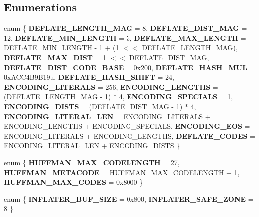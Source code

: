 \subsection*{Enumerations}
\begin{DoxyCompactItemize}
\item 
\mbox{\label{namespaceeka2l1_1_1flate_a0f9d064c5a1df98b8648bf2179261c23}} 
enum \{ \newline
{\bfseries D\+E\+F\+L\+A\+T\+E\+\_\+\+L\+E\+N\+G\+T\+H\+\_\+\+M\+AG} = 8, 
{\bfseries D\+E\+F\+L\+A\+T\+E\+\_\+\+D\+I\+S\+T\+\_\+\+M\+AG} = 12, 
{\bfseries D\+E\+F\+L\+A\+T\+E\+\_\+\+M\+I\+N\+\_\+\+L\+E\+N\+G\+TH} = 3, 
{\bfseries D\+E\+F\+L\+A\+T\+E\+\_\+\+M\+A\+X\+\_\+\+L\+E\+N\+G\+TH} = D\+E\+F\+L\+A\+T\+E\+\_\+\+M\+I\+N\+\_\+\+L\+E\+N\+G\+TH -\/ 1 + (1 $<$$<$ D\+E\+F\+L\+A\+T\+E\+\_\+\+L\+E\+N\+G\+T\+H\+\_\+\+M\+AG), 
\newline
{\bfseries D\+E\+F\+L\+A\+T\+E\+\_\+\+M\+A\+X\+\_\+\+D\+I\+ST} = 1 $<$$<$ D\+E\+F\+L\+A\+T\+E\+\_\+\+D\+I\+S\+T\+\_\+\+M\+AG, 
{\bfseries D\+E\+F\+L\+A\+T\+E\+\_\+\+D\+I\+S\+T\+\_\+\+C\+O\+D\+E\+\_\+\+B\+A\+SE} = 0x200, 
{\bfseries D\+E\+F\+L\+A\+T\+E\+\_\+\+H\+A\+S\+H\+\_\+\+M\+UL} = 0x\+A\+C\+C4\+B9\+B19u, 
{\bfseries D\+E\+F\+L\+A\+T\+E\+\_\+\+H\+A\+S\+H\+\_\+\+S\+H\+I\+FT} = 24, 
\newline
{\bfseries E\+N\+C\+O\+D\+I\+N\+G\+\_\+\+L\+I\+T\+E\+R\+A\+LS} = 256, 
{\bfseries E\+N\+C\+O\+D\+I\+N\+G\+\_\+\+L\+E\+N\+G\+T\+HS} = (D\+E\+F\+L\+A\+T\+E\+\_\+\+L\+E\+N\+G\+T\+H\+\_\+\+M\+AG -\/ 1) $\ast$ 4, 
{\bfseries E\+N\+C\+O\+D\+I\+N\+G\+\_\+\+S\+P\+E\+C\+I\+A\+LS} = 1, 
{\bfseries E\+N\+C\+O\+D\+I\+N\+G\+\_\+\+D\+I\+S\+TS} = (D\+E\+F\+L\+A\+T\+E\+\_\+\+D\+I\+S\+T\+\_\+\+M\+AG -\/ 1) $\ast$ 4, 
\newline
{\bfseries E\+N\+C\+O\+D\+I\+N\+G\+\_\+\+L\+I\+T\+E\+R\+A\+L\+\_\+\+L\+EN} = E\+N\+C\+O\+D\+I\+N\+G\+\_\+\+L\+I\+T\+E\+R\+A\+LS + E\+N\+C\+O\+D\+I\+N\+G\+\_\+\+L\+E\+N\+G\+T\+HS + E\+N\+C\+O\+D\+I\+N\+G\+\_\+\+S\+P\+E\+C\+I\+A\+LS, 
{\bfseries E\+N\+C\+O\+D\+I\+N\+G\+\_\+\+E\+OS} = E\+N\+C\+O\+D\+I\+N\+G\+\_\+\+L\+I\+T\+E\+R\+A\+LS + E\+N\+C\+O\+D\+I\+N\+G\+\_\+\+L\+E\+N\+G\+T\+HS, 
{\bfseries D\+E\+F\+L\+A\+T\+E\+\_\+\+C\+O\+D\+ES} = E\+N\+C\+O\+D\+I\+N\+G\+\_\+\+L\+I\+T\+E\+R\+A\+L\+\_\+\+L\+EN + E\+N\+C\+O\+D\+I\+N\+G\+\_\+\+D\+I\+S\+TS
 \}
\item 
\mbox{\label{namespaceeka2l1_1_1flate_a67cd47e12cea3df5633f077a51bd5c4c}} 
enum \{ {\bfseries H\+U\+F\+F\+M\+A\+N\+\_\+\+M\+A\+X\+\_\+\+C\+O\+D\+E\+L\+E\+N\+G\+TH} = 27, 
{\bfseries H\+U\+F\+F\+M\+A\+N\+\_\+\+M\+E\+T\+A\+C\+O\+DE} = H\+U\+F\+F\+M\+A\+N\+\_\+\+M\+A\+X\+\_\+\+C\+O\+D\+E\+L\+E\+N\+G\+TH + 1, 
{\bfseries H\+U\+F\+F\+M\+A\+N\+\_\+\+M\+A\+X\+\_\+\+C\+O\+D\+ES} = 0x8000
 \}
\item 
\mbox{\label{namespaceeka2l1_1_1flate_a87f213a8cfec12c5a8737d5270ed43da}} 
enum \{ {\bfseries I\+N\+F\+L\+A\+T\+E\+R\+\_\+\+B\+U\+F\+\_\+\+S\+I\+ZE} = 0x800, 
{\bfseries I\+N\+F\+L\+A\+T\+E\+R\+\_\+\+S\+A\+F\+E\+\_\+\+Z\+O\+NE} = 8
 \}
\end{DoxyCompactItemize}
